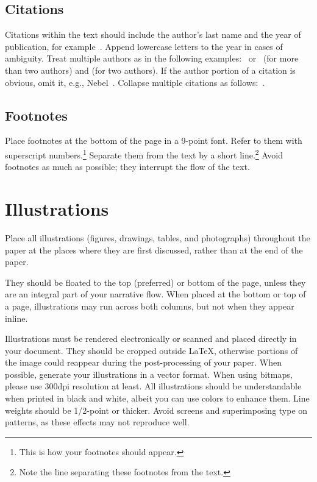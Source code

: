 \documentclass{article}
\begin{document}
\subsection{Citations}

Citations within the text should include the author's last name and
the year of publication, for example~\cite{gottlob:nonmon}.  Append
lowercase letters to the year in cases of ambiguity.  Treat multiple
authors as in the following examples:~\cite{abelson-et-al:scheme}
or~\cite{bgf:Lixto} (for more than two authors) and
\cite{brachman-schmolze:kl-one} (for two authors).  If the author
portion of a citation is obvious, omit it, e.g.,
Nebel~.  Collapse multiple citations as
follows:~\cite{gls:hypertrees,levesque:functional-foundations}.
\nocite{abelson-et-al:scheme}
\nocite{bgf:Lixto}
\nocite{brachman-schmolze:kl-one}
\nocite{gottlob:nonmon}
\nocite{gls:hypertrees}
\nocite{levesque:functional-foundations}
\nocite{levesque:belief}
\nocite{nebel:jair-2000}

\subsection{Footnotes}

Place footnotes at the bottom of the page in a 9-point font.  Refer to
them with superscript numbers.\footnote{This is how your footnotes
    should appear.} Separate them from the text by a short
line.\footnote{Note the line separating these footnotes from the
    text.} Avoid footnotes as much as possible; they interrupt the flow of
the text.

\section{Illustrations}

Place all illustrations (figures, drawings, tables, and photographs)
throughout the paper at the places where they are first discussed,
rather than at the end of the paper.

They should be floated to the top (preferred) or bottom of the page,
unless they are an integral part
of your narrative flow. When placed at the bottom or top of
a page, illustrations may run across both columns, but not when they
appear inline.

Illustrations must be rendered electronically or scanned and placed
directly in your document. They should be cropped outside \LaTeX{},
otherwise portions of the image could reappear during the post-processing of your paper.
When possible, generate your illustrations in a vector format.
When using bitmaps, please use 300dpi resolution at least.
All illustrations should be understandable when printed in black and
white, albeit you can use colors to enhance them. Line weights should
be 1/2-point or thicker. Avoid screens and superimposing type on
patterns, as these effects may not reproduce well.
\end{document}
